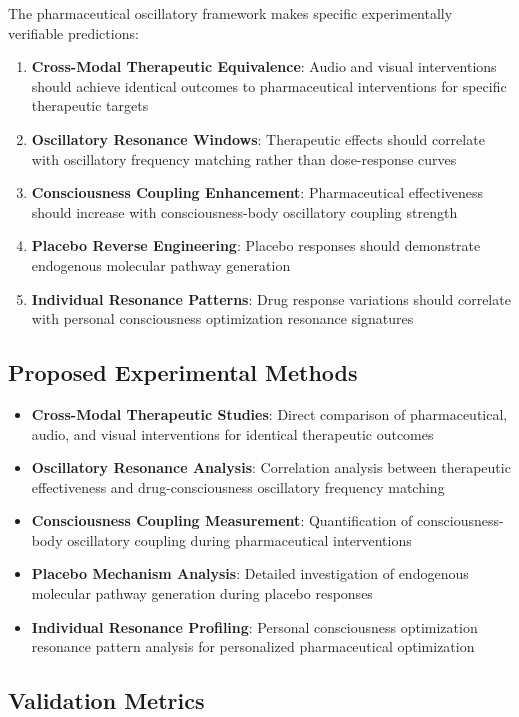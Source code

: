 \documentclass[12pt,a4paper]{article}
\begin{document}
The pharmaceutical oscillatory framework makes specific experimentally verifiable predictions:

\begin{enumerate}
\item \textbf{Cross-Modal Therapeutic Equivalence}: Audio and visual interventions should achieve identical outcomes to pharmaceutical interventions for specific therapeutic targets
\item \textbf{Oscillatory Resonance Windows}: Therapeutic effects should correlate with oscillatory frequency matching rather than dose-response curves
\item \textbf{Consciousness Coupling Enhancement}: Pharmaceutical effectiveness should increase with consciousness-body oscillatory coupling strength
\item \textbf{Placebo Reverse Engineering}: Placebo responses should demonstrate endogenous molecular pathway generation
\item \textbf{Individual Resonance Patterns}: Drug response variations should correlate with personal consciousness optimization resonance signatures
\end{enumerate}

\subsection{Proposed Experimental Methods}

\begin{itemize}
\item \textbf{Cross-Modal Therapeutic Studies}: Direct comparison of pharmaceutical, audio, and visual interventions for identical therapeutic outcomes
\item \textbf{Oscillatory Resonance Analysis}: Correlation analysis between therapeutic effectiveness and drug-consciousness oscillatory frequency matching
\item \textbf{Consciousness Coupling Measurement}: Quantification of consciousness-body oscillatory coupling during pharmaceutical interventions
\item \textbf{Placebo Mechanism Analysis}: Detailed investigation of endogenous molecular pathway generation during placebo responses
\item \textbf{Individual Resonance Profiling}: Personal consciousness optimization resonance pattern analysis for personalized pharmaceutical optimization
\end{itemize}

\subsection{Validation Metrics}
\end{document}
